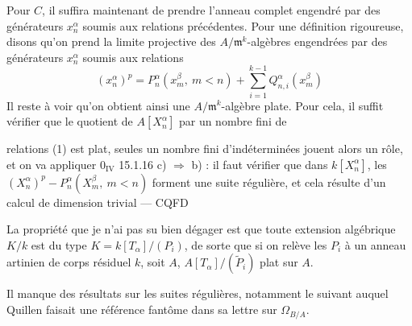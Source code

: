 \documentclass[11pt,a4paper]{article}
\begin{document}
\begin{enumerate}
    Pour $C$, il suffira maintenant de prendre l'anneau complet engendré par
    des générateurs $x_n^\alpha$ soumis aux relations précédentes. Pour une
    définition rigoureuse, disons qu'on prend la limite projective des
    $A/\mathfrak{m}^k$-algèbres engendrées par des générateurs $x_n^\alpha$
    soumis aux relations
    \begin{equation}
      (x_n^\alpha)^p = P_n^\alpha(x_m^\beta,\ m < n) + \sum_{i=1}^{k-1} Q_{n,i}^\alpha(x_m^\beta)
    \end{equation}
    Il reste à voir qu'on obtient ainsi une $A/\mathfrak{m}^k$-algèbre plate.
    Pour cela, il suffit vérifier que le quotient de $A[X_n^\alpha]$ par un
    nombre fini de
\end{enumerate}
relations (1) est plat, seules un nombre fini d'indéterminées jouent alors un
rôle, et on va appliquer $0_{\mathrm{IV}}$ 15.1.16 c) $\Rightarrow$ b) : il faut
vérifier que dans $k[X_n^\alpha]$, les $(X_n^\alpha)^p - P_n^\alpha(X_m^\beta,\ m < n)$
forment une suite régulière, et cela résulte d'un calcul de dimension trivial —
CQFD

La propriété que je n'ai pas su bien dégager est que toute extension
algébrique $K/k$ est du type $K = k[T_\alpha]/(P_i)$, de sorte que si on relève
les $P_i$ à un anneau artinien de corps résiduel $k$, soit $A$,
$A[T_\alpha]/(\widetilde{P}_i)$  plat sur $A$.

Il manque des résultats sur les suites régulières, notamment le suivant auquel
Quillen faisait une référence fantôme dans sa lettre sur $\Omega_{B/A}$.

\end{document}
